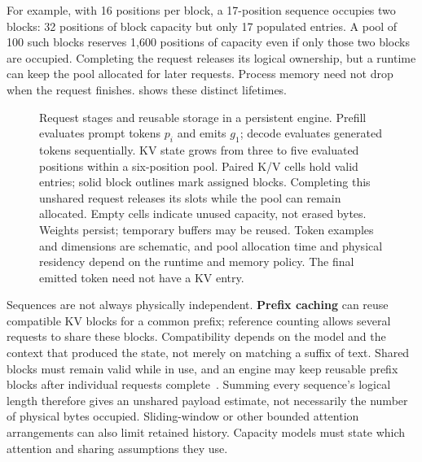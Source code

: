 For example, with 16 positions per block, a 17-position sequence occupies
two blocks: 32 positions of block capacity but only 17 populated entries.
A pool of 100 such blocks reserves 1{,}600 positions of capacity even if
only those two blocks are occupied.  Completing the request releases its
logical ownership, but a runtime can keep the pool allocated for later
requests.  Process memory need not drop when the request finishes.
 shows these distinct lifetimes.

\begin{figure}[htbp]
\centering

\caption{Request stages and reusable storage in a persistent engine.
Prefill evaluates prompt tokens \(p_i\) and emits \(g_1\); decode
evaluates generated tokens sequentially.  KV state grows from three to
five evaluated positions within a six-position pool.  Paired K/V cells
hold valid entries; solid block outlines mark assigned blocks.
Completing this unshared request releases its slots while the pool can
remain allocated.  Empty cells indicate unused capacity, not erased
bytes.  Weights persist; temporary buffers may be reused.  Token examples
and dimensions are schematic, and pool allocation time and physical
residency depend on the runtime and memory policy.  The final emitted
token need not have a KV entry.}
\label{fig:inference-memory-lifetimes}
\end{figure}
\FloatBarrier

Sequences are not always physically independent.  \textbf{Prefix caching}
can reuse compatible KV blocks for a common prefix; reference counting
allows several requests to share these blocks.  Compatibility depends
on the model and the context that produced the state, not merely on
matching a suffix of text.  Shared blocks must remain valid while in
use, and an engine may keep reusable prefix blocks after individual
requests complete~\cite{vllmprefix2026}.  Summing every sequence's logical
length therefore gives an unshared payload estimate, not necessarily
the number of physical bytes occupied.  Sliding-window or other bounded
attention arrangements can also limit retained history.  Capacity models
must state which attention and sharing assumptions they use.
\FloatBarrier
